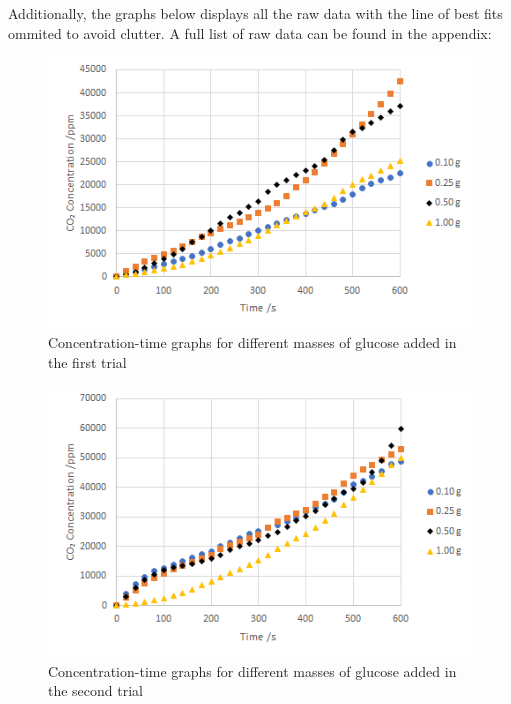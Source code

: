 \documentclass{article}
\begin{document}
Additionally, the graphs below displays all the raw data with the line of best fits ommited to avoid clutter. A full list of raw data can be found in the appendix:
\begin{figure}[H]
    \renewcommand{\figurename}{Graph}
    \setcounter{figure}{2}
    \centering
    \includegraphics{figures/graph_03.png}
    \vspace*{-12pt}
    \caption{Concentration-time graphs for different masses of glucose added in the first trial}
    \label{fig:graph3}
\end{figure}

\begin{figure}[H]
    \renewcommand{\figurename}{Graph}
    \setcounter{figure}{3}
    \centering
    \includegraphics{figures/graph_04.png}
    \vspace*{-12pt}
    \caption{Concentration-time graphs for different masses of glucose added in the second trial}
    \label{fig:graph4}
\end{figure}
\end{document}
